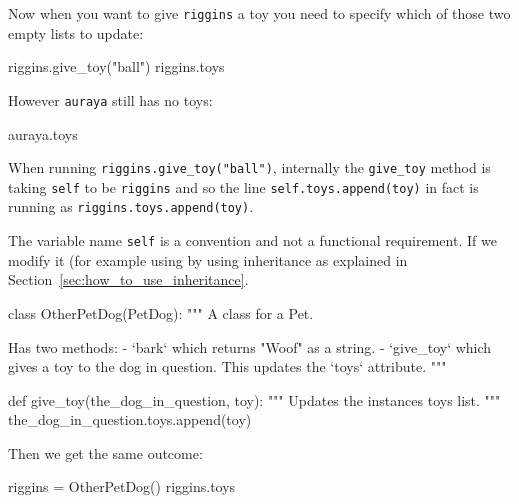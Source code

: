 Now when you want to give \texttt{riggins} a toy you need to specify which of those two
empty lists to update:




\begin{pyin}
riggins.give_toy("ball")
riggins.toys
\end{pyin}





\begin{raw}
['ball']
\end{raw}

However \texttt{auraya} still has no toys:

\begin{pyin}
auraya.toys
\end{pyin}





\begin{raw}
[]
\end{raw}





When running \texttt{riggins.give\_toy("ball")}, internally the \texttt{give\_toy} method is
taking \texttt{self} to be \texttt{riggins} and so the
line \texttt{self.toys.append(toy)} in fact is running as \texttt{riggins.toys.append(toy)}.


The variable name \texttt{self} is a convention and not a functional requirement.
If we modify it
(for example using by using inheritance as explained in
Section~\ref{sec:how_to_use_inheritance}.




\begin{pyin}
class OtherPetDog(PetDog):
    """
    A class for a Pet.

    Has two methods:
        - `bark` which returns "Woof" as a string.
        - `give_toy` which gives a toy to the dog in question. This updates the
          `toys` attribute.
    """

    def give_toy(the_dog_in_question, toy):
        """
        Updates the instances toys list.
        """
        the_dog_in_question.toys.append(toy)
\end{pyin}





Then we get the same outcome:




\begin{pyin}
riggins = OtherPetDog()
riggins.toys
\end{pyin}





